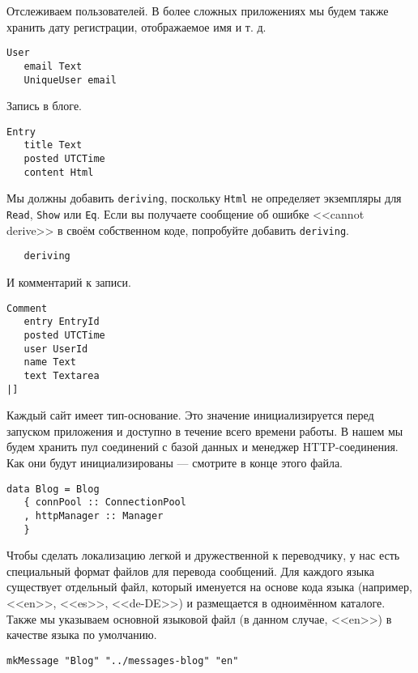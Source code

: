 Отслеживаем пользователей. В более сложных приложениях мы будем также хранить дату регистрации, отображаемое имя и т. д.
 
\begin{lstlisting}
User
   email Text
   UniqueUser email
\end{lstlisting}
 
Запись в блоге. 
 
\begin{lstlisting}
Entry
   title Text
   posted UTCTime
   content Html
\end{lstlisting}
 
Мы должны добавить \lstinline!deriving!, поскольку \lstinline!Html! не определяет экземпляры для \lstinline!Read!, \lstinline!Show! или \lstinline!Eq!. Если вы получаете сообщение об ошибке <<cannot derive>> в своём собственном коде, попробуйте добавить \lstinline!deriving!.
 
\begin{lstlisting}
   deriving
\end{lstlisting}
 
И комментарий к записи.
 
\begin{lstlisting}
Comment
   entry EntryId
   posted UTCTime
   user UserId
   name Text
   text Textarea
|]
\end{lstlisting}
 
Каждый сайт имеет тип-основание. Это значение инициализируется перед запуском приложения и доступно в течение всего времени работы. В нашем мы будем хранить пул соединений с базой данных и менеджер HTTP-соединения. Как они будут инициализированы --- смотрите в конце этого файла.
 
\begin{lstlisting}
data Blog = Blog
   { connPool :: ConnectionPool
   , httpManager :: Manager
   }
\end{lstlisting}
 
Чтобы сделать локализацию легкой и дружественной к переводчику, у нас есть специальный формат файлов для перевода сообщений. Для каждого языка существует отдельный файл, который именуется на основе кода языка (например, <<en>>, <<es>>, <<de-DE>>) и размещается в одноимённом каталоге. Также мы указываем основной языковой файл (в данном случае, <<en>>) в качестве языка по умолчанию.
 
\begin{lstlisting}
mkMessage "Blog" "../messages-blog" "en"
\end{lstlisting}
 
